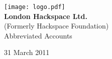 


\begin{titlepage}
\begin{center}
\texttt{[image: logo.pdf]}\\[48pt]
{\bf \LARGE London Hackspace Ltd.}\\[14pt]
(Formerly Hackspace Foundation) \\[36pt]
{\Large Abbreviated Accounts}

\vfill
31 March 2011

\end{center}
\end{titlepage}





